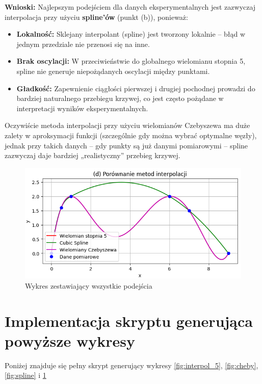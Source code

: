 \documentclass{article}
\begin{document}
\medskip

\textbf{Wnioski:}  
Najlepszym podejściem dla danych eksperymentalnych jest zazwyczaj interpolacja przy użyciu \textbf{spline’ów} (punkt (b)), ponieważ:
\begin{itemize}
    \item \textbf{Lokalność:} Sklejany interpolant (spline) jest tworzony lokalnie – błąd w jednym przedziale nie przenosi się na inne.
    \item \textbf{Brak oscylacji:} W przeciwieństwie do globalnego wielomianu stopnia 5, spline nie generuje niepożądanych oscylacji między punktami.
    \item \textbf{Gładkość:} Zapewnienie ciągłości pierwszej i drugiej pochodnej prowadzi do bardziej naturalnego przebiegu krzywej, co jest często pożądane w interpretacji wyników eksperymentalnych.
\end{itemize}
Oczywiście metoda interpolacji przy użyciu wielomianów Czebyszewa ma duże zalety w aproksymacji funkcji (szczególnie gdy można wybrać optymalne węzły), jednak przy takich danych – gdy punkty są już danymi pomiarowymi – spline zazwyczaj daje bardziej „realistyczny” przebieg krzywej.

\begin{figure}[H]
    \centering
    \includegraphics[width=1\linewidth]{Zestawienie.png}
    \caption{Wykres zestawiający wszystkie podejścia}
    \label{fig:all}
\end{figure}

\section*{Implementacja skryptu generująca powyższe wykresy}

Poniżej znajduje się pełny skrypt generujący wykresy \ref{fig:interpol_5}, \ref{fig:cheby}, \ref{fig:spline} i \ref{fig:all}
\end{document}
